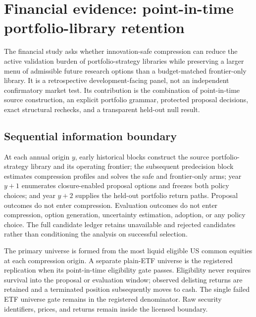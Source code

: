 \section{Financial evidence: point-in-time portfolio-library retention}
\label{sec:financial-case-studies}
\label{sec:financial-compression-audit}

The financial study asks whether innovation-safe compression can reduce the
active validation burden of portfolio-strategy libraries while preserving a
larger menu of admissible future research options than a budget-matched
frontier-only library. It is a retrospective development-facing panel, not an
independent confirmatory market test. Its contribution is the combination of
point-in-time source construction, an explicit portfolio grammar, protected
proposal decisions, exact structural rechecks, and a transparent held-out null
result.

\subsection{Sequential information boundary}

At each annual origin \(y\), early historical blocks construct the source
portfolio-strategy library and its operating frontier; the subsequent
predecision block estimates compression profiles and solves the safe and
frontier-only arms; year \(y+1\) enumerates closure-enabled proposal options and
freezes both policy choices; and year \(y+2\) supplies the held-out portfolio
return paths. Proposal outcomes do not enter compression. Evaluation outcomes
do not enter compression, option generation, uncertainty estimation, adoption,
or any policy choice. The full candidate ledger retains unavailable and
rejected candidates rather than conditioning the analysis on successful
selection.

The primary universe is formed from the most liquid eligible US common
equities at each compression origin. A separate plain-ETF universe is the
registered replication when its point-in-time eligibility gate passes.
Eligibility never requires survival into the proposal or evaluation window;
observed delisting returns are retained and a terminated position subsequently
moves to cash. The single failed ETF universe gate remains in the registered
denominator. Raw security identifiers, prices, and returns remain inside the
licensed boundary.


